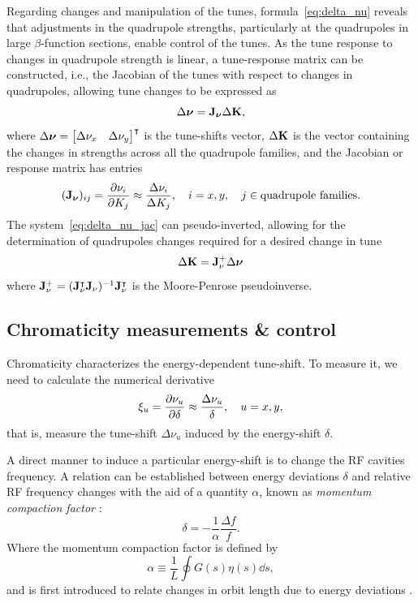 Regarding changes and manipulation of the tunes, formula~\eqref{eq:delta_nu} reveals that adjustments in the quadrupole strengths, particularly at the quadrupoles in large $\beta$-function sections, enable control of the tunes. As the tune response to changes in quadrupole strength is linear, a tune-response matrix can be constructed, i.e., the Jacobian of the tunes with respect to changes in quadrupoles, allowing tune changes to be expressed as
\begin{equation}
    \Delta\boldsymbol{\nu} = \vb{J}_{\boldsymbol{\nu}}\Delta \vb{K},
    \label{eq:delta_nu_jac}
\end{equation}
where $\Delta\boldsymbol{\nu} = \mqty*[\Delta \nu_x & \Delta \nu_y]^\intercal$ is the tune-shifts vector, $\Delta \vb{K}$ is the vector containing the changes in strengths across all the quadrupole families, and the Jacobian or response matrix has entries
\begin{equation}
    (\vb{J}_{\boldsymbol{\nu}})_{ij} = \pdv{\nu_{i}}{K_j} \approx \frac{\Delta \nu_{i}}{\Delta K_j}, \quad i=x, y,\quad j\in\text{quadrupole families}.
\end{equation}
The system~\eqref{eq:delta_nu_jac} can pseudo-inverted, allowing for the determination of quadrupoles changes required for a desired change in tune
\begin{equation}
    \Delta \vb{K} = \vb{J}_{\nu}^{+}\Delta \boldsymbol{\nu}
\end{equation}
where $\vb{J}_{\nu}^{+} = (\vb{J}_{\nu}^{\intercal}\vb{J}_{\nu})^{-1}\vb{J}_{\nu}^{\intercal}$ is the Moore-Penrose pseudoinverse.

\subsection{Chromaticity measurements \& control}
Chromaticity characterizes the energy-dependent tune-shift. To measure it, we need to calculate the numerical derivative
\begin{equation}
    \xi_u = \pdv{\nu_u}{\delta}\approx \frac{\Delta \nu_u}{\delta}, \quad u=x, y,
    \label{eq:chrom_numerical}
\end{equation}
that is, measure the tune-shift $\Delta \nu_u$ induced by the energy-shift $\delta$.

A direct manner to induce a particular energy-shift is to change the RF cavities frequency. A relation can be established between energy deviations $\delta$ and relative RF frequency changes with the aid of a quantity $\alpha$, known as \textit{momentum compaction factor} \cite{lee_accelerator_2004,sands_physics_1969}:
\begin{equation}
    \delta = -\frac{1}{\alpha}\frac{\Delta f}{f}.
    \label{eq:delta_frequency}
\end{equation}
Where the momentum compaction factor is defined by
\begin{equation}
    \alpha \equiv \frac{1}{L}\oint G(s) \eta(s) \dd{s},
\end{equation}
and is first introduced to relate changes in orbit length due to energy deviations \cite{sands_physics_1969}.

